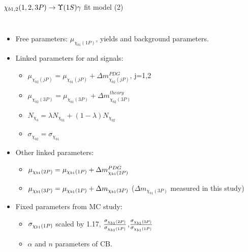 \begin{frame}{$\chi_{b1,2}(1,2,3P) \to \OneS \gamma$ fit model (2)}
\begin{columns}[T]
\begin{itemize}
\item Free parameters: $\mu_{\chi_{b1}(1P)}$, yields and background parameters.
\item Linked parameters for \chibone and \chibtwo signals:
    \begin{itemize}
    \item $\mu_{\chi_{b2}(jP)} = \mu_{\chi_{b1}(jP)} + \Delta m_{\chi_{b2}(jP)}^{PDG}$, j=1,2
    \item $\mu_{\chi_{b2}(3P)} = \mu_{\chi_{b1}(3P)} + \Delta m_{\chi_{b2}(3P)}^{theory}$
    \item $N_{\chi_{b}} = \lambda N_{\chi_{b1}} + (1-\lambda) N_{\chi_{b2}}$
    \item $\sigma_{\chi_{b2}} = \sigma_{\chi_{b1}}$
    \end{itemize}
\item Other linked parameters:    
    \begin{itemize}
        \item $\mu_{\chi_{b 1}(2P)} = \mu_{\chi_{b 1}(1P)} + \Delta m_{\chi_{b1}(2P)}^{PDG}$
        \item $\mu_{\chi_{b 1}(3P)} = \mu_{\chi_{b 1}(1P)} + \Delta m_{\chi_{b1}(3P)}$ ($\Delta m_{\chi_{b1}(3P)}$ measured in this study)
    \end{itemize}
\item Fixed parameters from MC study:
    \begin{itemize}
    \item $\sigma_{\chi_{b 1}(1P)}$ \scriptsize{scaled by 1.17}, $\frac{\sigma_{\chi_{b 1}(2P)}}{\sigma_{\chi_{b 1}(1P)}}$,$\frac{\sigma_{\chi_{b 1}(3P)}}{\sigma_{\chi_{b 1}(1P)}}$
    \item $\alpha$ and $n$ parameters of CB.
    \end{itemize}
\end{itemize}
\end{columns}
\end{frame}
